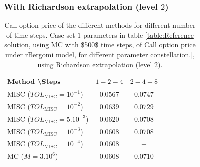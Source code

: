 \subsubsection*{With Richardson extrapolation (level $2$)}
\begin{table}[h!]
	\centering
	\begin{tabular}{l*{6}{c}r}
		Method \textbackslash  Steps           &$1-2-4$ & $2-4-8$ \\
		\hline
		
		MISC ($TOL_{\text{MISC}}=10^{-1}$)  &$0.0567$  &$0.0747$   \\
		MISC ($TOL_{\text{MISC}}=10^{-2}$)  & $		0.0639$ & $0.0729$   \\
		MISC ($TOL_{\text{MISC}}=5.10^{-3}$)  & $	0.0620$ & $0.0708$   \\
		MISC ($TOL_{\text{MISC}}=10^{-3}$)  & $	0.0608$ & $0.0708$  \\
		MISC ($TOL_{\text{MISC}}=10^{-4}$)  & $	0.0608$ & $-$   \\
		\hline
		MC ($M=3.10^6$)  & $0.0608$ & $0.0710$   \\
		\hline 
	\end{tabular}
	\caption{ Call option price of the different methods for different number of time steps.  Case set $1$ parameters in table \ref{table:Reference solution, using MC with $500$ time steps, of Call option price under rBergomi model, for different parameter constellation.}, using Richardson extrapolation (level $2$).}
	\label{table: Call option price of the different methods for different number of time steps. Case $K=1$, using Richardson extrapolation_level2}
\end{table}




